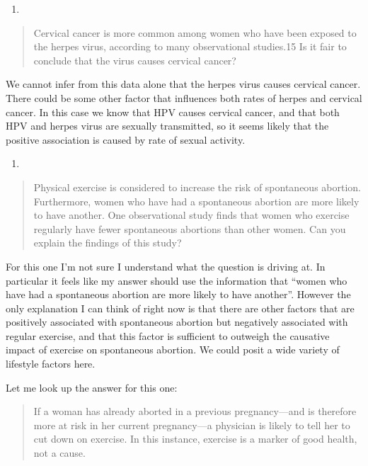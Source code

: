 \documentclass[
]{book}
\providecommand{\tightlist}{%
  \setlength{\itemsep}{0pt}\setlength{\parskip}{0pt}}
\begin{document}
\begin{enumerate}
\def\labelenumi{\arabic{enumi}.}
\setcounter{enumi}{10}
\tightlist
\item
\end{enumerate}

\begin{quote}
Cervical cancer is more common among women who have been exposed to the herpes virus, according to many observational studies.15 Is it fair to conclude that the virus causes cervical cancer?
\end{quote}

We cannot infer from this data alone that the herpes virus causes cervical cancer. There could be some other factor that influences both rates of herpes and cervical cancer. In this case we know that HPV causes cervical cancer, and that both HPV and herpes virus are sexually transmitted, so it seems likely that the positive association is caused by rate of sexual activity.

\begin{enumerate}
\def\labelenumi{\arabic{enumi}.}
\setcounter{enumi}{11}
\tightlist
\item
\end{enumerate}

\begin{quote}
Physical exercise is considered to increase the risk of spontaneous abortion. Furthermore, women who have had a spontaneous abortion are more likely to have another. One observational study finds that women who exercise regularly have fewer spontaneous abortions than other women. Can you explain the findings of this study?
\end{quote}

For this one I'm not sure I understand what the question is driving at. In particular it feels like my answer should use the information that ``women who have had a spontaneous abortion are more likely to have another''. However the only explanation I can think of right now is that there are other factors that are positively associated with spontaneous abortion but negatively associated with regular exercise, and that this factor is sufficient to outweigh the causative impact of exercise on spontaneous abortion. We could posit a wide variety of lifestyle factors here.

Let me look up the answer for this one:

\begin{quote}
If a woman has already aborted in a previous pregnancy---and is therefore more at risk in her current pregnancy---a physician is likely to tell her to cut down on exercise. In this instance, exercise is a marker of good health, not a cause.
\end{quote}
\end{document}
